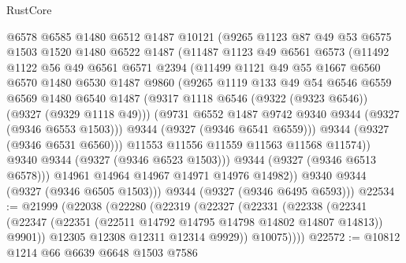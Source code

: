\begin{lexlean}{RustCore}
\begin{coremodule}
              @6578
              @6585
              @1480
              @6512
              @1487
              @10121
              (@9265
                @1123
                @87
                @49
                @53
                @6575
                @1503
                @1520
                @1480
                @6522
                @1487
                (@11487
                  @1123
                  @49
                  @6561
                  @6573
                  (@11492
                    @1122
                    @56
                    @49
                    @6561
                    @6571
                    @2394
                    (@11499
                      @1121
                      @49
                      @55
                      @1667
                      @6560
                      @6570
                      @1480
                      @6530
                      @1487
                      @9860
                      (@9265
                        @1119
                        @133
                        @49
                        @54
                        @6546
                        @6559
                        @6569
                        @1480
                        @6540
                        @1487
                        (@9317 @1118 @6546 (@9322 (@9323 @6546)) (@9327 (@9329 @1118 @49)))
                        (@9731 @6552 @1487 @9742 @9340 @9344 (@9327 (@9346 @6553 @1503)))
                        @9344
                        (@9327 (@9346 @6541 @6559)))
                      @9344
                      (@9327 (@9346 @6531 @6560)))
                    @11553
                    @11556
                    @11559
                    @11563
                    @11568
                    @11574))
                @9340
                @9344
                (@9327 (@9346 @6523 @1503)))
              @9344
              (@9327 (@9346 @6513 @6578)))
            @14961
            @14964
            @14967
            @14971
            @14976
            @14982))
        @9340
        @9344
        (@9327 (@9346 @6505 @1503)))
      @9344
      (@9327 (@9346 @6495 @6593)))
@22534 := @21999
    (@22038
      (@22280
        (@22319
          (@22327
            (@22331
              (@22338
                (@22341 (@22347 (@22351 (@22511 @14792 @14795 @14798 @14802 @14807 @14813)) @9901))
                @12305
                @12308
                @12311
                @12314
                @9929))
            @10075))))
@22572 := @10812
    @1214
    @66
    @6639
    @6648
    @1503
    @7586

\end{coremodule}
\end{lexlean}
